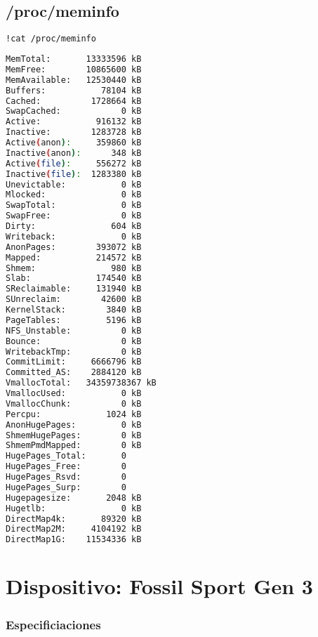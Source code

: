 \subsection{/proc/meminfo}
\begin{lstlisting}[language=bash,tabsize=2,name=cpuinfo,frame=single]
!cat /proc/meminfo
\end{lstlisting}
\begin{lstlisting}[language=bash,name=cpuinfo,backgroundcolor=\color{Gray!20},lineskip=-1pt,basicstyle=\footnotesize]
MemTotal:       13333596 kB
MemFree:        10865600 kB
MemAvailable:   12530440 kB
Buffers:           78104 kB
Cached:          1728664 kB
SwapCached:            0 kB
Active:           916132 kB
Inactive:        1283728 kB
Active(anon):     359860 kB
Inactive(anon):      348 kB
Active(file):     556272 kB
Inactive(file):  1283380 kB
Unevictable:           0 kB
Mlocked:               0 kB
SwapTotal:             0 kB
SwapFree:              0 kB
Dirty:               604 kB
Writeback:             0 kB
AnonPages:        393072 kB
Mapped:           214572 kB
Shmem:               980 kB
Slab:             174540 kB
SReclaimable:     131940 kB
SUnreclaim:        42600 kB
KernelStack:        3840 kB
PageTables:         5196 kB
NFS_Unstable:          0 kB
Bounce:                0 kB
WritebackTmp:          0 kB
CommitLimit:     6666796 kB
Committed_AS:    2884120 kB
VmallocTotal:   34359738367 kB
VmallocUsed:           0 kB
VmallocChunk:          0 kB
Percpu:             1024 kB
AnonHugePages:         0 kB
ShmemHugePages:        0 kB
ShmemPmdMapped:        0 kB
HugePages_Total:       0
HugePages_Free:        0
HugePages_Rsvd:        0
HugePages_Surp:        0
Hugepagesize:       2048 kB
Hugetlb:               0 kB
DirectMap4k:       89320 kB
DirectMap2M:     4104192 kB
DirectMap1G:    11534336 kB
\end{lstlisting}

\section{Dispositivo: Fossil Sport Gen 3} \label{app:fossil}

\subsubsection{Especificiaciones}

